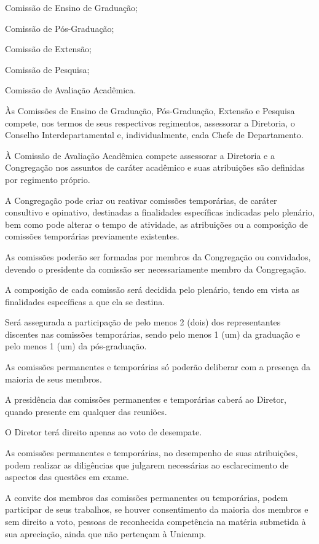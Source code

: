 \documentclass{documento}
\begin{document}
\inciso Comissão de Ensino de Graduação;

\inciso Comissão de Pós-Graduação;

\inciso Comissão de Extensão;

\inciso Comissão de Pesquisa;

\inciso Comissão de Avaliação Acadêmica.

\paragrafo Às Comissões de Ensino de Graduação, Pós-Graduação, Extensão e Pesquisa compete, nos termos de seus respectivos regimentos, assessorar a Diretoria, o Conselho Interdepartamental e, individualmente, cada Chefe de Departamento.

\paragrafo À Comissão de Avaliação Acadêmica compete assessorar a Diretoria e a Congregação nos assuntos de caráter acadêmico e suas atribuições são definidas por regimento próprio.

\artigo A Congregação pode criar ou reativar comissões temporárias, de caráter consultivo e opinativo, destinadas a finalidades específicas indicadas pelo plenário, bem como pode alterar o tempo de atividade, as atribuições ou a composição de comissões temporárias previamente existentes.

\paragrafo As comissões poderão ser formadas por membros da Congregação ou convidados, devendo o presidente da comissão ser necessariamente membro da Congregação.

\paragrafo A composição de cada comissão será decidida pelo plenário, tendo em vista as finalidades específicas a que ela se destina.

\paragrafo Será assegurada a participação de pelo menos 2 (dois) dos representantes discentes nas comissões temporárias, sendo pelo menos 1 (um) da graduação e pelo menos 1 (um) da pós-graduação.

\artigo As comissões permanentes e temporárias só poderão deliberar com a presença da maioria de seus membros.

\paragrafo A presidência das comissões permanentes e temporárias caberá ao Diretor, quando presente em qualquer das reuniões.

\paragrafo O Diretor terá direito apenas ao voto de desempate.

\artigo As comissões permanentes e temporárias, no desempenho de suas atribuições, podem realizar as diligências que julgarem necessárias ao esclarecimento de aspectos das questões em exame.

\artigo A convite dos membros das comissões permanentes ou temporárias, podem participar de seus trabalhos, se houver consentimento da maioria dos membros e sem direito a voto, pessoas de reconhecida competência na matéria submetida à sua apreciação, ainda que não pertençam à Unicamp.
\end{document}

